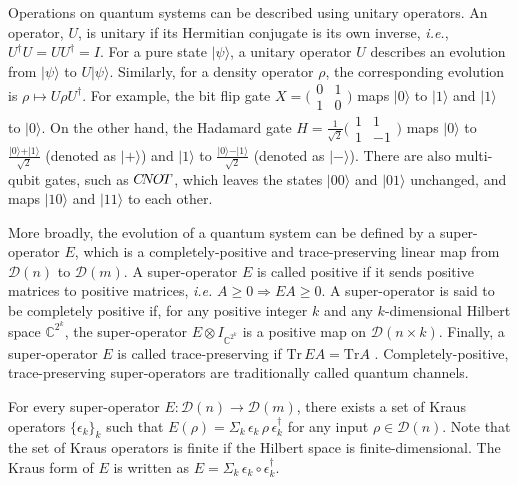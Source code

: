 Operations on quantum systems can be described using unitary operators. An operator, $U$, is unitary if its Hermitian conjugate is its own inverse, \textit{i.e.}, $U^{\dag} U= UU^{\dag} = I$. For a pure state $|\psi \rangle$, a unitary operator $U$ describes an evolution from $|\psi \rangle$ to $ U|\psi \rangle$. Similarly, for a density operator $\rho $, the corresponding evolution is $\rho \mapsto U\rho U^{\dag}$. For example, the bit flip gate $X=\big(\begin{smallmatrix}
  0 & 1\\
  1 & 0
\end{smallmatrix}\big)$ maps  $\vert 0 \rangle$  to  $\vert 1 \rangle$ and  $\vert 1 \rangle$  to  $\vert 0 \rangle$. On the other hand, the Hadamard gate $H= \frac{1}{\sqrt{2}}\big(\begin{smallmatrix}
  1 & 1\\
  1 & -1
\end{smallmatrix}\big)$ maps $\vert 0 \rangle$ to  $ \frac{\vert 0 \rangle + \vert 1 \rangle }{\sqrt{2}} $ (denoted as $\vert + \rangle $) and $\vert 1 \rangle$ to $ \frac{\vert 0 \rangle - \vert 1 \rangle }{\sqrt{2}} $ (denoted as $\vert - \rangle $). There are also multi-qubit gates, such as $C\hspace{-2pt}N\hspace{-1pt}O\hspace{-1pt}T$, which leaves the states $\vert 0 0 \rangle$ and  $\vert 0 1 \rangle$ unchanged, and maps $\vert 1 0 \rangle$ and $\vert 1 1 \rangle$ to each other.

More broadly, the evolution of a quantum system can be defined by a super-operator $E$, which is a completely-positive and trace-preserving linear map from $\mathcal{D} (n)$ to $\mathcal{D} (m)$. A super-operator $E$ is called positive if it sends positive matrices to positive matrices, \textit{i.e.} $A \geq 0 \Rightarrow{} E A \geq 0$. A super-operator is said to be completely positive if, for any positive integer $k$ and any $k$-dimensional Hilbert space $\mathbb{C}^{2^{k}}$, the super-operator $E \otimes I_{\mathbb{C}^{2^{k}}}$ is a positive map on $\mathcal{D}(n \times k)$. Finally, a super-operator
$E$ is called trace-preserving if $\text{Tr} \hspace{ 2pt} E A = \text{Tr} A$ \cite{watrous2018theory}. Completely-positive, trace-preserving super-operators are traditionally called quantum channels.

For every super-operator $ E: \mathcal{D}(n) \xrightarrow{} \mathcal{D}(m)$, there exists a set of Kraus operators $\{\epsilon_{k}\}_{k}$ such that $ E(\rho)= \Sigma_{k} \hspace{2pt} \epsilon_{k}\hspace{2pt} \rho \hspace{2pt} \epsilon_{k}^{\dag}$  for any input $\rho \in  \mathcal{D}(n) $. Note that the set of Kraus operators is finite if the Hilbert space is finite-dimensional. The Kraus form of $E$ is written as $E = \Sigma_{k} \hspace{2pt} \epsilon_{k} \circ  \epsilon_{k}^{\dag}$.

